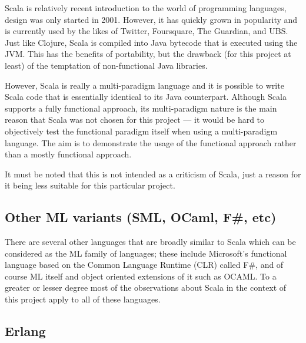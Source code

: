 Scala is relatively recent introduction to the world of programming languages, design was only started in 2001. However, it has quickly grown in popularity and is currently used by the likes of Twitter, Foursquare, The Guardian, and UBS. Just like Clojure, Scala is compiled into Java bytecode that is executed using the JVM. This has the benefits of portability, but the drawback (for this project at least) of the temptation of non-functional Java libraries.

However, Scala is really a multi-paradigm language and it is possible to write Scala code that is essentially identical to its Java counterpart. Although Scala supports a fully functional approach, its multi-paradigm nature is the main reason that Scala was not chosen for this project --- it would be hard to objectively test the functional paradigm itself when using a multi-paradigm language. The aim is to demonstrate the usage of the functional approach rather than a mostly functional approach. 

It must be noted that this is not intended as a criticism of Scala, just a reason for it being less suitable for this particular project.


\subsection{Other ML variants (SML, OCaml, F\#, etc)}


There are several other languages that are broadly similar to Scala which can be considered as the ML family of languages; these include Microsoft's functional language based on the Common Language Runtime (CLR) called F\#, and of course ML itself and object oriented extensions of it such as OCAML. To a greater or lesser degree most of the observations about Scala in the context of this project apply to all of these languages.

\subsection{Erlang}



